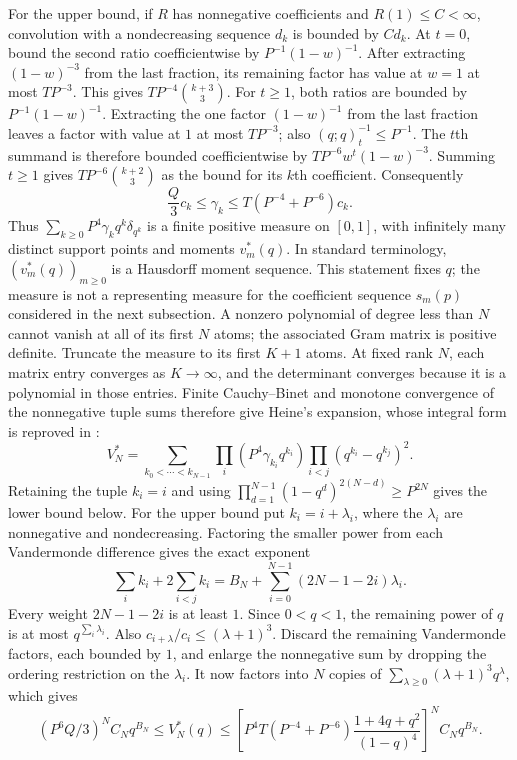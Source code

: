 \documentclass[11pt]{article}
\begin{document}
For the upper bound, if $R$ has nonnegative coefficients and
$R(1)\le C<\infty$, convolution with a nondecreasing sequence $d_k$
is bounded by $Cd_k$. At $t=0$, bound the second ratio coefficientwise
by $P^{-1}(1-w)^{-1}$. After extracting $(1-w)^{-3}$ from the last
fraction, its remaining factor has value at $w=1$ at most $TP^{-3}$.
This gives $TP^{-4}\binom{k+3}3$.
For $t\ge1$, both ratios are bounded by $P^{-1}(1-w)^{-1}$.
Extracting the one factor $(1-w)^{-1}$ from the last fraction leaves
a factor with value at $1$ at most $TP^{-3}$; also $(q;q)_t^{-1}\le P^{-1}$.
The $t$th summand is therefore bounded coefficientwise by
$TP^{-6}w^t(1-w)^{-3}$. Summing $t\ge1$ gives
$TP^{-6}\binom{k+2}3$ as the bound for its $k$th coefficient. Consequently
\[
 \frac Q3 c_k\le\gamma_k\le T(P^{-4}+P^{-6})c_k.
\]
Thus $\sum_{k\ge0}P^4\gamma_kq^k\delta_{q^k}$ is a finite positive measure
on $[0,1]$, with infinitely many distinct support points and moments
$v_m^*(q)$. In standard terminology, $(v_m^*(q))_{m\ge0}$ is a
Hausdorff moment sequence. This statement fixes $q$; the measure is
not a representing measure for the coefficient sequence $s_m(p)$
considered in the next subsection.
A nonzero polynomial of degree less than $N$ cannot vanish at all of its
first $N$ atoms; the associated Gram matrix is positive definite.
Truncate the measure to its first $K+1$ atoms. At fixed rank $N$, each
matrix entry converges as $K\to\infty$, and the determinant converges
because it is a polynomial in those entries. Finite Cauchy--Binet and
monotone convergence of the nonnegative tuple sums therefore give
Heine's expansion, whose integral form is reproved in
\cite[Sec.~2, (2)--(5), pp.~2--3]{zudilin2017det}:
\[
 V_N^*=\sum_{k_0<\cdots<k_{N-1}}
 \prod_i(P^4\gamma_{k_i}q^{k_i})\prod_{i<j}(q^{k_i}-q^{k_j})^2.
\]
Retaining the tuple $k_i=i$ and using
$\prod_{d=1}^{N-1}(1-q^d)^{2(N-d)}\ge P^{2N}$ gives the lower bound
below. For the upper bound put $k_i=i+\lambda_i$, where the
$\lambda_i$ are nonnegative and nondecreasing. Factoring the smaller
power from each Vandermonde difference gives the exact exponent
\[
 \sum_i k_i+2\sum_{i<j}k_i
 =B_N+\sum_{i=0}^{N-1}(2N-1-2i)\lambda_i.
\]
Every weight $2N-1-2i$ is at least $1$. Since $0<q<1$, the remaining
power of $q$ is at most $q^{\sum_i\lambda_i}$. Also
$c_{i+\lambda}/c_i\le(\lambda+1)^3$. Discard the remaining
Vandermonde factors, each bounded by $1$, and enlarge the nonnegative
sum by dropping the ordering restriction on the $\lambda_i$.
It now factors into $N$ copies of $\sum_{\lambda\ge0}(\lambda+1)^3q^\lambda$,
which gives
\[
 (P^6Q/3)^N C_Nq^{B_N}\le V_N^*(q)
 \le\left[P^4T(P^{-4}+P^{-6})
          \frac{1+4q+q^2}{(1-q)^4}\right]^N C_Nq^{B_N}.
\]
\end{document}
